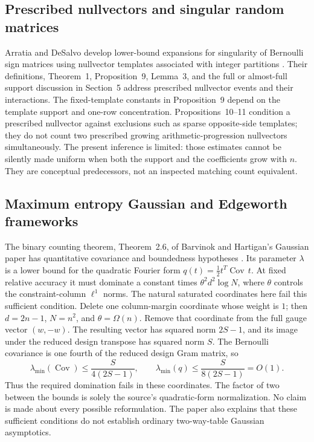 \documentclass[11pt]{article}
\theoremstyle{definition}\newtheorem{definition}[theorem]{Definition}
\theoremstyle{remark}\newtheorem{remark}[theorem]{Remark}
\begin{document}
\subsection{Prescribed nullvectors and singular random matrices}
Arratia and DeSalvo develop lower-bound expansions for singularity of Bernoulli
sign matrices using nullvector templates associated with integer partitions
\cite{arratia}. Their definitions, Theorem~1, Proposition~9, Lemma~3, and the
full or almost-full support discussion in Section~5 address prescribed
nullvector events and their interactions. The fixed-template constants in
Proposition~9 depend on the template support and one-row concentration.
Propositions~10--11 condition a prescribed nullvector against exclusions such
as sparse opposite-side templates; they do not count two prescribed growing
arithmetic-progression nullvectors simultaneously. The present inference is
limited: those estimates cannot be silently made uniform when both the
support and the coefficients grow with $n$. They are conceptual predecessors,
not an inspected matching count equivalent.

\subsection{Maximum entropy Gaussian and Edgeworth frameworks}
The binary counting theorem, Theorem~2.6, of Barvinok and Hartigan's Gaussian
paper has quantitative covariance and boundedness hypotheses
\cite{bhgaussian}. Its parameter $\lambda$ is a lower bound for the quadratic Fourier form
$q(t)=\tfrac12t^T\operatorname{Cov}\,t$. At fixed relative accuracy it must
dominate a constant times $\theta^2d^2\log N$, where $\theta$ controls the
constraint-column $\ell^1$ norms. The natural saturated coordinates here fail
this sufficient condition. Delete one column-margin coordinate whose weight
is $1$; then $d=2n-1$, $N=n^2$, and $\theta=\Omega(n)$. Remove that coordinate
from the full gauge vector $(w,-w)$. The resulting vector has squared norm
$2S-1$, and its image under the reduced design transpose has squared norm $S$.
The Bernoulli covariance is one fourth of the reduced design Gram matrix, so
\[
 \lambda_{\min}(\operatorname{Cov})\le\frac{S}{4(2S-1)},\qquad
 \lambda_{\min}(q)\le\frac{S}{8(2S-1)}=O(1).
\]
Thus the required domination fails in these coordinates. The factor of two
between the bounds is solely the source's quadratic-form normalization. No
claim is made about every possible reformulation. The paper also explains
that these sufficient conditions do not establish ordinary two-way-table
Gaussian asymptotics.
\end{document}

